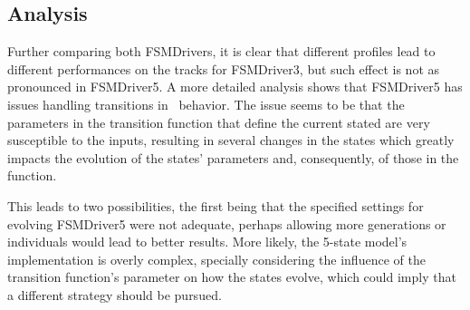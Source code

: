

\subsection{Analysis}
Further comparing both FSMDrivers, it is clear that different profiles lead to different performances on the tracks for FSMDriver3, but such effect is not as pronounced in FSMDriver5. A more detailed analysis shows that FSMDriver5 has issues handling transitions in \racing~behavior. The issue seems to be that the parameters  in the transition function that define the current stated are very susceptible to the inputs, resulting in several changes in the states which greatly impacts the evolution of the states' parameters and, consequently, of those in the function.

This leads to two possibilities, the first being that the specified settings for evolving FSMDriver5 were not adequate, perhaps allowing more generations or individuals would lead to better results. More likely, the 5-state model's implementation is overly complex, specially considering the influence of the transition function's parameter  on how the states evolve, which could imply that a different strategy should be pursued.
